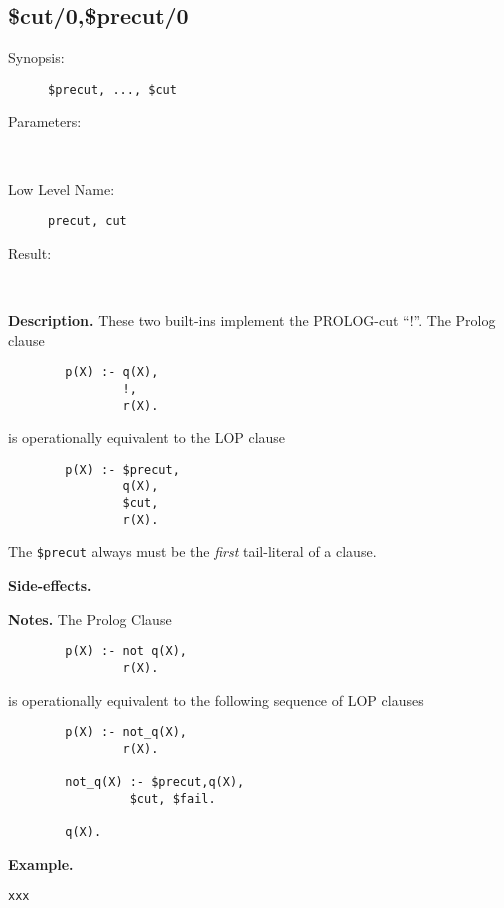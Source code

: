 %
%
%
\subsection{\$cut/0,\$precut/0}

\begin{description}
\item[Synopsis:]
	{\tt \$precut, ..., \$cut}
\item[Parameters:]\ \\[-0.5cm]
\item[Low Level Name:]
	{\tt precut, cut}
\item[Result:]\ \\
\end{description}

\vspace*{0.5cm}
\noindent
{\bf Description.}
These two built-ins implement the PROLOG-cut ``!''.
The Prolog clause
 
\begin{verbatim}
        p(X) :- q(X),
                !,
                r(X).
\end{verbatim}
% 
is operationally equivalent to the LOP clause
% 
\begin{verbatim}
        p(X) :- $precut,
                q(X),
                $cut,
                r(X).
\end{verbatim}
 
The {\tt \$precut} always must be the {\em first\/} tail-literal of a clause.


\vspace*{0.5cm}
\noindent
{\bf Side-effects.}

\vspace*{0.5cm}
\noindent
{\bf Notes.}
The Prolog Clause
 
\begin{verbatim}
        p(X) :- not q(X),
                r(X).
\end{verbatim}
 
             is operationally equivalent to the following sequence of
             LOP clauses
 
\begin{verbatim}
        p(X) :- not_q(X),
                r(X).
 
        not_q(X) :- $precut,q(X),
                 $cut, $fail.
 
        q(X).
\end{verbatim}
 


\vspace*{0.5cm}
\noindent
{\bf Example.}
\begin{verbatim}
xxx
\end{verbatim}


